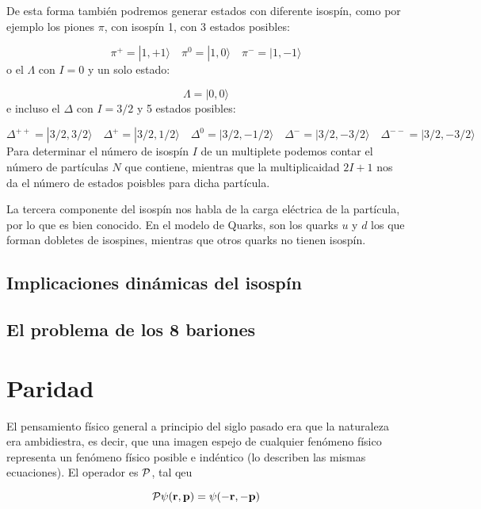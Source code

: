 De esta forma también podremos generar estados con diferente isospín, como por ejemplo los piones $\pi$, con isospín 1, con 3 estados posibles: 

\begin{equation}
    \pi^+ = |1,+1\rangle 
    \quad \pi^0 = |1,0\rangle
    \quad \pi^- = |1,-1\rangle
\end{equation}
o el $\Lambda$ con $I=0$ y un solo estado:

\begin{equation}
    \Lambda = |0,0\rangle
\end{equation}
e incluso el $\Delta$ con $I=3/2$ y 5 estados posibles: 

\begin{equation}
    \Delta^{++} = |3/2,3/2\rangle
    \quad \Delta^+ = |3/2,1/2\rangle
    \quad \Delta^0 = |3/2,-1/2\rangle
    \quad \Delta^- = |3/2,-3/2\rangle
    \quad \Delta^{--} = |3/2,-3/2\rangle
\end{equation}
Para determinar el número de isospín $I$ de un multiplete podemos contar el número de partículas $N$ que contiene, mientras que la multiplicaidad $2I+1$ nos da el número de estados poisbles para dicha partícula. 

La tercera componente del isospín nos habla de la carga eléctrica de la partícula, por lo que es bien conocido. En el modelo de Quarks, son los quarks $u$ y $d$ los que forman dobletes de isospines, mientras que otros quarks no tienen isospín. 

\subsection{Implicaciones dinámicas del isospín}

\subsection{El problema de los 8 bariones}

\section{Paridad}

El pensamiento físico general a principio del siglo pasado era que la naturaleza era ambidiestra, es decir, que una imagen espejo de cualquier fenómeno físico representa un fenómeno físico posible e indéntico (lo describen las mismas ecuaciones). El operador es $\mathcal{P}$, tal qeu 

\begin{equation*}
    \mathcal{P} \psi(\mathbf{r},\mathbf{p}) = \psi(-\mathbf{r},-\mathbf{p})
\end{equation*}

